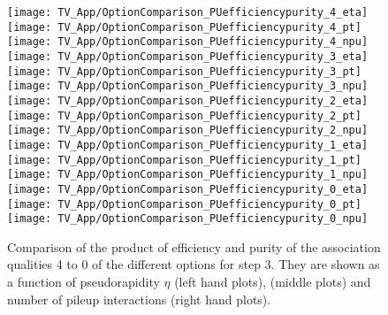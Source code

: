 \begin{figure}[!h]
  \centering
  \texttt{[image: TV\_App/OptionComparison\_PUefficiencypurity\_4\_eta]}
  \texttt{[image: TV\_App/OptionComparison\_PUefficiencypurity\_4\_pt]}
  \texttt{[image: TV\_App/OptionComparison\_PUefficiencypurity\_4\_npu]}
  \\
  \texttt{[image: TV\_App/OptionComparison\_PUefficiencypurity\_3\_eta]}
  \texttt{[image: TV\_App/OptionComparison\_PUefficiencypurity\_3\_pt]}
  \texttt{[image: TV\_App/OptionComparison\_PUefficiencypurity\_3\_npu]}
  \\
  \texttt{[image: TV\_App/OptionComparison\_PUefficiencypurity\_2\_eta]}
  \texttt{[image: TV\_App/OptionComparison\_PUefficiencypurity\_2\_pt]}
  \texttt{[image: TV\_App/OptionComparison\_PUefficiencypurity\_2\_npu]}
  \\
  \texttt{[image: TV\_App/OptionComparison\_PUefficiencypurity\_1\_eta]}
  \texttt{[image: TV\_App/OptionComparison\_PUefficiencypurity\_1\_pt]}
  \texttt{[image: TV\_App/OptionComparison\_PUefficiencypurity\_1\_npu]}
  \\
  \texttt{[image: TV\_App/OptionComparison\_PUefficiencypurity\_0\_eta]}
  \texttt{[image: TV\_App/OptionComparison\_PUefficiencypurity\_0\_pt]}
  \texttt{[image: TV\_App/OptionComparison\_PUefficiencypurity\_0\_npu]}
  \\
\caption[Comparison of the association qualities 4 to 0 of the different options for step 3 of the association map.]{Comparison of the product of efficiency and purity of the association qualities 4 to 0 of the different options for step 3. They are shown as a function of pseudorapidity $\eta$ (left hand plots), \pt{} (middle plots) and number of pileup interactions (right hand plots). \label{sec:TrackAss_AppPileup}}
\end{figure}
